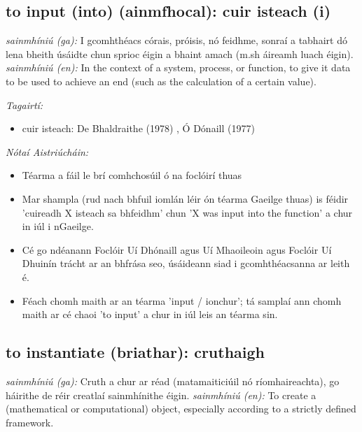 \documentclass{article}
\begin{document}
\subsection*{to input (into) (ainmfhocal): cuir isteach (i)} 
 \noindent \textit{sainmhíniú (ga):} I gcomhthéacs córais, próisis, nó feidhme, sonraí a tabhairt dó lena bheith úsáidte chun sprioc éigin a bhaint amach (m.sh áireamh luach éigin).
\newline\newline
 \noindent \textit{sainmhíniú (en):} In the context of a system, process, or function, to give it data to be used to achieve an end (such as the calculation of a certain value).
\newline

 \noindent \textit{Tagairtí:}
\begin{itemize}
	\item cuir isteach: De Bhaldraithe (1978) \cite{de-bhaldraithe}, Ó Dónaill (1977) \cite{odonaill}
\end{itemize}

 \noindent \textit{Nótaí Aistriúcháin:}
\begin{itemize}
	\item Téarma a fáil le brí comhchosúil ó na foclóirí thuas
	\item Mar shampla (rud nach bhfuil iomlán léir ón téarma Gaeilge thuas) is féidir 'cuireadh X isteach sa bhfeidhm' chun 'X was input into the function' a chur in iúl i nGaeilge.
	\item Cé go ndéanann Foclóir Uí Dhónaill agus Uí Mhaoileoin agus Foclóir Uí Dhuinín trácht ar an bhfrása seo, úsáideann siad i gcomhthéacsanna ar leith é.
	\item Féach chomh maith ar an téarma 'input / ionchur'; tá samplaí ann chomh maith ar cé chaoi 'to input' a chur in iúl leis an téarma sin.
\end{itemize}


\subsection*{to instantiate (briathar): cruthaigh} 
 \noindent \textit{sainmhíniú (ga):} Cruth a chur ar réad (matamaiticiúil nó ríomhaireachta), go háirithe de réir creatlaí sainmhínithe éigin.
\newline\newline
 \noindent \textit{sainmhíniú (en):} To create a (mathematical or computational) object, especially according to a strictly defined framework.
\newline
\end{document}
